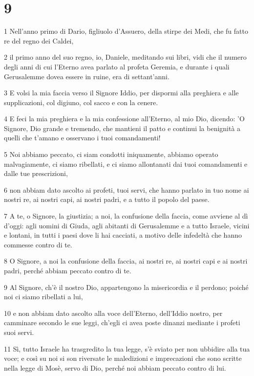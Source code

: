 \chapter{9}

\par 1 Nell'anno primo di Dario, figliuolo d'Assuero, della stirpe dei Medi, che fu fatto re del regno dei Caldei,
\par 2 il primo anno del suo regno, io, Daniele, meditando sui libri, vidi che il numero degli anni di cui l'Eterno avea parlato al profeta Geremia, e durante i quali Gerusalemme dovea essere in ruine, era di settant'anni.
\par 3 E volsi la mia faccia verso il Signore Iddio, per dispormi alla preghiera e alle supplicazioni, col digiuno, col sacco e con la cenere.
\par 4 E feci la mia preghiera e la mia confessione all'Eterno, al mio Dio, dicendo: 'O Signore, Dio grande e tremendo, che mantieni il patto e continui la benignità a quelli che t'amano e osservano i tuoi comandamenti!
\par 5 Noi abbiamo peccato, ci siam condotti iniquamente, abbiamo operato malvagiamente, ci siamo ribellati, e ci siamo allontanati dai tuoi comandamenti e dalle tue prescrizioni,
\par 6 non abbiam dato ascolto ai profeti, tuoi servi, che hanno parlato in tuo nome ai nostri re, ai nostri capi, ai nostri padri, e a tutto il popolo del paese.
\par 7 A te, o Signore, la giustizia; a noi, la confusione della faccia, come avviene al dì d'oggi: agli uomini di Giuda, agli abitanti di Gerusalemme e a tutto Israele, vicini e lontani, in tutti i paesi dove li hai cacciati, a motivo delle infedeltà che hanno commesse contro di te.
\par 8 O Signore, a noi la confusione della faccia, ai nostri re, ai nostri capi e ai nostri padri, perché abbiam peccato contro di te.
\par 9 Al Signore, ch'è il nostro Dio, appartengono la misericordia e il perdono; poiché noi ci siamo ribellati a lui,
\par 10 e non abbiam dato ascolto alla voce dell'Eterno, dell'Iddio nostro, per camminare secondo le sue leggi, ch'egli ci avea poste dinanzi mediante i profeti suoi servi.
\par 11 Sì, tutto Israele ha trasgredito la tua legge, s'è sviato per non ubbidire alla tua voce; e così su noi si son riversate le maledizioni e imprecazioni che sono scritte nella legge di Mosè, servo di Dio, perché noi abbiam peccato contro di lui.
